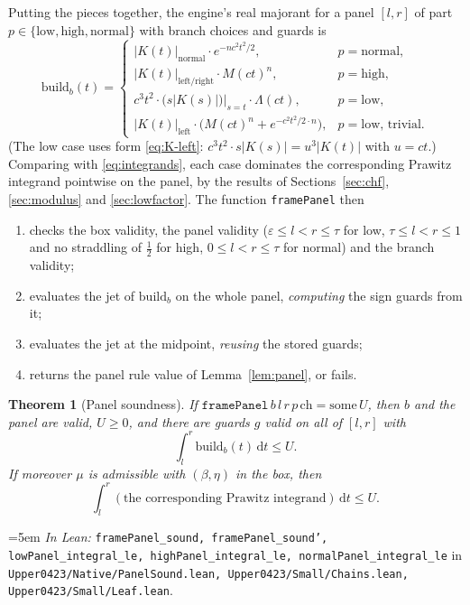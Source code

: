 \documentclass[11pt,a4paper]{article}
\newtheorem{theorem}{Theorem}[section]
\theoremstyle{definition}
\newcommand{\dd}{\,\mathrm{d}}
\newcommand{\Lean}[1]{\texttt{#1}}
\newcommand{\file}[1]{\texttt{#1}}
\newcommand{\formal}[2]{%
  \par\smallskip
  \begingroup\small\raggedright\emergencystretch=5em
  \noindent\textit{In Lean:} \Lean{#1} in \file{#2}.\par
  \endgroup\smallskip}
\begin{document}
Putting the pieces together, the engine's real majorant for a panel $[l,r]$ of
part $p\in\{\text{low},\text{high},\text{normal}\}$ with branch choices and
guards is
\[
  \mathrm{build}_b(t)=
  \begin{cases}
    |K(t)|_{\text{normal}}\cdot e^{-n c^2t^2/2}, & p=\text{normal},\\[2pt]
    |K(t)|_{\text{left/right}}\cdot M(ct)^n, & p=\text{high},\\[2pt]
    c^3t^2\cdot\bigl(s|K(s)|\bigr)\big|_{s=t}\cdot\Lambda(ct), & p=\text{low},\\[2pt]
    |K(t)|_{\text{left}}\cdot\bigl(M(ct)^n+e^{-c^2t^2/2\cdot n}\bigr),
      & p=\text{low, trivial}.
  \end{cases}
\]
(The low case uses form \eqref{eq:K-left}: $c^3t^2\cdot s|K(s)|=u^3|K(t)|$ with
$u=ct$.) Comparing with \eqref{eq:integrands}, each case dominates the
corresponding Prawitz integrand pointwise on the panel, by the results of
Sections~\ref{sec:chf}, \ref{sec:modulus} and \ref{sec:lowfactor}. The function
\Lean{framePanel} then

\begin{enumerate}[label=(\arabic*),leftmargin=2.2em]
\item checks the box validity, the panel validity ($\varepsilon\le l<r\le\tau$ for
  low, $\tau\le l<r\le1$ and no straddling of $\tfrac12$ for high,
  $0\le l<r\le\tau$ for normal) and the branch validity;
\item evaluates the jet of $\mathrm{build}_b$ on the whole panel, \emph{computing}
  the sign guards from it;
\item evaluates the jet at the midpoint, \emph{reusing} the stored guards;
\item returns the panel rule value of Lemma~\ref{lem:panel}, or fails.
\end{enumerate}

\begin{theorem}[Panel soundness]
  \label{thm:panelsound}
  If $\Lean{framePanel}\,b\,l\,r\,p\,\mathrm{ch}=\mathrm{some}\,U$, then $b$ and
  the panel are valid, $U\ge0$, and there are guards $g$ valid on all of
  $[l,r]$ with
  \[
    \int_l^r\mathrm{build}_b(t)\dd t\le U .
  \]
  If moreover $\mu$ is admissible with $(\beta,\eta)$ in the box, then
  \[
    \int_l^r(\text{the corresponding Prawitz integrand})\dd t\le U .
  \]
\end{theorem}
\formal{framePanel\_sound, framePanel\_sound', lowPanel\_integral\_le, highPanel\_integral\_le, normalPanel\_integral\_le}{Upper0423/Native/PanelSound.lean, Upper0423/Small/Chains.lean, Upper0423/Small/Leaf.lean}
\end{document}

